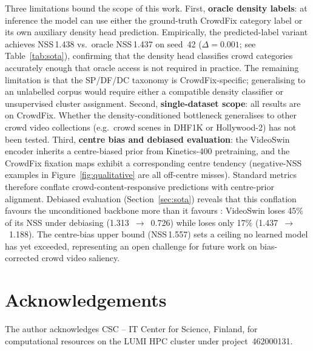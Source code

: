 \documentclass[twocolumn]{article}
\begin{document}
Three limitations bound the scope of this work.
First, \textbf{oracle density labels}: at inference the model can use
either the ground-truth CrowdFix category label or its own auxiliary
density head prediction.  Empirically, the predicted-label variant
achieves NSS\,1.438 vs.\ oracle NSS\,1.437 on seed~42 ($\Delta\!=\!0.001$;
see Table~\ref{tab:sota}), confirming that the density head classifies
crowd categories accurately enough that oracle access is not required in
practice.  The remaining limitation is that the SP/DF/DC taxonomy is
CrowdFix-specific; generalising to an unlabelled corpus would require
either a compatible density classifier or unsupervised cluster assignment.
Second, \textbf{single-dataset scope}: all results are on CrowdFix.
Whether the density-conditioned bottleneck generalises to other crowd
video collections (e.g.\ crowd scenes in DHF1K or Hollywood-2) has not
been tested.
Third, \textbf{centre bias and debiased evaluation}: the VideoSwin encoder
inherits a centre-biased prior from Kinetics-400 pretraining, and the
CrowdFix fixation maps exhibit a corresponding centre tendency
(negative-NSS examples in Figure~\ref{fig:qualitative} are all off-centre
misses).  Standard metrics therefore conflate crowd-content-responsive
predictions with centre-prior alignment.  Debiased evaluation
(Section~\ref{sec:sota}) reveals that this conflation favours the
unconditioned backbone more than it favours \ourmodel{}: VideoSwin loses
45\% of its NSS under debiasing (1.313~$\to$~0.726) while \ourmodel{} loses
only 17\% (1.437~$\to$~1.188).  The centre-bias upper bound (NSS\,1.557)
sets a ceiling no learned model has yet exceeded, representing an open
challenge for future work on bias-corrected crowd video saliency.

\section*{Acknowledgements}

The author acknowledges CSC -- IT Center for Science, Finland, for
computational resources on the LUMI HPC cluster under project~462000131.



\end{document}
